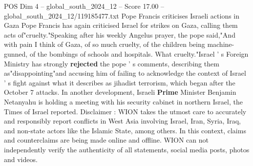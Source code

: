 \begin{textsample}{POS Dim 4 – global\_south\_2024\_12 – Score 17.00 – global\_south\_2024\_12/119185477.txt}
Pope Francis criticises Israeli actions in Gaza Pope Francis has again criticised Israel for strikes on Gaza, calling them acts of"cruelty."Speaking after his weekly Angelus prayer, the pope said,"And with pain I think of Gaza, of so much cruelty, of the children being machine-gunned, of the bombings of schools and hospitals.
What cruelty."Israel ' s Foreign Ministry has strongly \textbf{rejected} the pope ' s comments, describing them as"disappointing"and accusing him of failing to acknowledge the context of Israel ' s fight against what it describes as jihadist terrorism, which began after the October 7 attacks.
In another development, Israeli \textbf{Prime} Minister Benjamin Netanyahu is holding a meeting with his security cabinet in northern Israel, the Times of Israel reported.
Disclaimer : WION takes the utmost care to accurately and responsibly report conflicts in West Asia involving Israel, Iran, Syria, Iraq, and non-state actors like the Islamic State, among others.
In this context, claims and counterclaims are being made online and offline.
WION can not independently verify the authenticity of all statements, social media posts, photos and videos.

\end{textsample}
